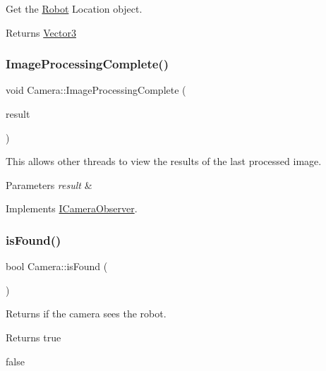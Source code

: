 Get the \hyperlink{classRobot}{Robot} Location object. 

\begin{DoxyReturn}{Returns}
\hyperlink{classVector3}{Vector3} 
\end{DoxyReturn}
\mbox{\label{classCamera_a28c3836707bdaf6e1a2098ec20460995}} 
\subsubsection{\texorpdfstring{Image\+Processing\+Complete()}{ImageProcessingComplete()}}
{\footnotesize\ttfamily void Camera\+::\+Image\+Processing\+Complete (\begin{DoxyParamCaption}\item[{\hyperlink{classICameraResult}{I\+Camera\+Result} $\ast$}]{result }\end{DoxyParamCaption})\hspace{0.3cm}{\ttfamily [virtual]}}



This allows other threads to view the results of the last processed image. 


\begin{DoxyParams}{Parameters}
{\em result} & \\
\hline
\end{DoxyParams}


Implements \hyperlink{classICameraObserver_a7d261bd08d570d05032e61b2d5252c88}{I\+Camera\+Observer}.

\mbox{\label{classCamera_a7a88bbfa9d8529f4351f5a7396d5e80b}} 
\subsubsection{\texorpdfstring{is\+Found()}{isFound()}}
{\footnotesize\ttfamily bool Camera\+::is\+Found (\begin{DoxyParamCaption}{ }\end{DoxyParamCaption})}



Returns if the camera sees the robot. 

\begin{DoxyReturn}{Returns}
true 

false 
\end{DoxyReturn}
\mbox{\label{classCamera_a792611ad34a1c595b61b7c72ce1d5e32}} 
